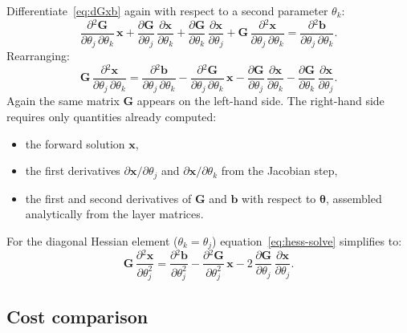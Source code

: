 \documentclass[11pt,a4paper]{article}
\newcommand{\ppd}[2]{\frac{\partial #1}{\partial #2}}
\theoremstyle{plain}
\theoremstyle{remark}
\begin{document}
Differentiate~\eqref{eq:dGxb} again with respect to a second parameter
$\theta_k$:
\begin{equation}\label{eq:d2Gxb}
  \ppd{{}^2\mathbf{G}}{\theta_j\,\partial\theta_k}\,\mathbf{x}
  + \ppd{\mathbf{G}}{\theta_j}\,\ppd{\mathbf{x}}{\theta_k}
  + \ppd{\mathbf{G}}{\theta_k}\,\ppd{\mathbf{x}}{\theta_j}
  + \mathbf{G}\,\ppd{{}^2\mathbf{x}}{\theta_j\,\partial\theta_k}
  = \ppd{{}^2\mathbf{b}}{\theta_j\,\partial\theta_k}.
\end{equation}
Rearranging:
\begin{equation}\label{eq:hess-solve}
  \boxed{
  \mathbf{G}\,\ppd{{}^2\mathbf{x}}{\theta_j\,\partial\theta_k}
  = \ppd{{}^2\mathbf{b}}{\theta_j\,\partial\theta_k}
    - \ppd{{}^2\mathbf{G}}{\theta_j\,\partial\theta_k}\,\mathbf{x}
    - \ppd{\mathbf{G}}{\theta_j}\,\ppd{\mathbf{x}}{\theta_k}
    - \ppd{\mathbf{G}}{\theta_k}\,\ppd{\mathbf{x}}{\theta_j}.
  }
\end{equation}
Again the same matrix $\mathbf{G}$ appears on the left-hand side.  The
right-hand side requires only quantities already computed:
\begin{itemize}[nosep]
  \item the forward solution $\mathbf{x}$,
  \item the first derivatives $\partial\mathbf{x}/\partial\theta_j$ and
    $\partial\mathbf{x}/\partial\theta_k$ from the Jacobian step,
  \item the first and second derivatives of $\mathbf{G}$ and $\mathbf{b}$
    with respect to $\bm{\theta}$, assembled analytically from the layer
    matrices.
\end{itemize}

\noindent For the diagonal Hessian element ($\theta_k = \theta_j$)
equation~\eqref{eq:hess-solve} simplifies to:
\begin{equation}\label{eq:hess-diag}
  \mathbf{G}\,\ppd{{}^2\mathbf{x}}{\theta_j^2}
  = \ppd{{}^2\mathbf{b}}{\theta_j^2}
    - \ppd{{}^2\mathbf{G}}{\theta_j^2}\,\mathbf{x}
    - 2\,\ppd{\mathbf{G}}{\theta_j}\,\ppd{\mathbf{x}}{\theta_j}.
\end{equation}

\subsection{Cost comparison}\label{sec:gmm-cost}
\end{document}

